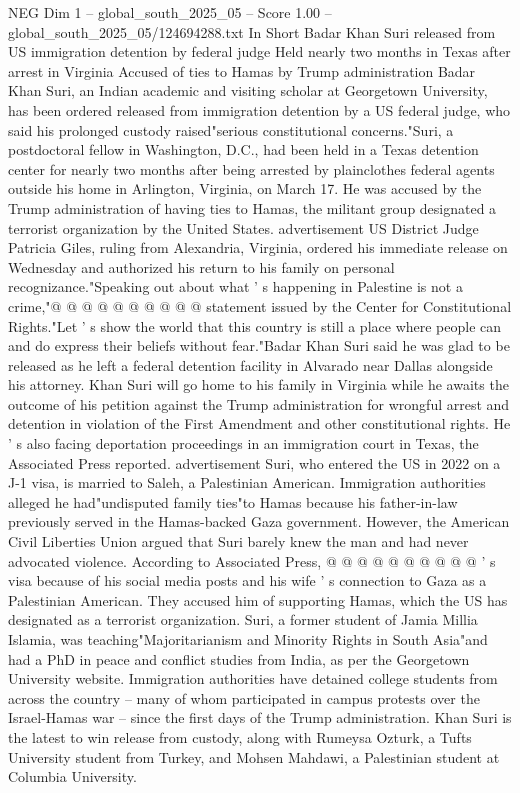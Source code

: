 \begin{textsample}{NEG Dim 1 – global\_south\_2025\_05 – Score 1.00 – global\_south\_2025\_05/124694288.txt}  \label{ex:f1_neg_385}
In Short Badar Khan Suri released from US immigration detention by federal judge Held nearly two months in Texas after arrest in Virginia Accused of ties to Hamas by Trump administration Badar Khan Suri, an Indian academic and visiting scholar at Georgetown University, has been ordered released from immigration detention by a US federal judge, who said his prolonged custody raised"serious constitutional concerns."Suri, a postdoctoral fellow in Washington, D.C., had been held in a Texas detention center for nearly two months after being arrested by plainclothes federal agents outside his home in Arlington, Virginia, on March 17.
He was accused by the Trump administration of having ties to Hamas, the militant group designated a terrorist organization by the United States. advertisement US District Judge Patricia Giles, ruling from Alexandria, Virginia, ordered his immediate release on Wednesday and authorized his return to his family on personal recognizance."Speaking out about what ' s happening in Palestine is not a crime,"@ @ @ @ @ @ @ @ @ @ statement issued by the Center for Constitutional Rights."Let ' s show the world that this country is still a place where people can and do express their beliefs without fear."Badar Khan Suri said he was glad to be released as he left a federal detention facility in Alvarado near Dallas alongside his attorney.
Khan Suri will go home to his family in Virginia while he awaits the outcome of his petition against the Trump administration for wrongful arrest and detention in violation of the First Amendment and other constitutional rights.
He ' s also facing deportation proceedings in an immigration court in Texas, the Associated Press reported. advertisement Suri, who entered the US in 2022 on a J-1 visa, is married to Saleh, a Palestinian American.
Immigration authorities alleged he had"undisputed family ties"to Hamas because his father-in-law previously served in the Hamas-backed Gaza government.
However, the American Civil Liberties Union argued that Suri barely knew the man and had never advocated violence.
According to Associated Press, @ @ @ @ @ @ @ @ @ @ ' s visa because of his social media posts and his wife ' s connection to Gaza as a Palestinian American.
They accused him of supporting Hamas, which the US has designated as a terrorist organization.
Suri, a former student of Jamia Millia Islamia, was teaching"Majoritarianism and Minority Rights in South Asia"and had a PhD in peace and conflict studies from India, as per the Georgetown University website.
Immigration authorities have detained college students from across the country -- many of whom participated in campus protests over the Israel-Hamas war -- since the first days of the Trump administration.
Khan Suri is the latest to win release from custody, along with Rumeysa Ozturk, a Tufts University student from Turkey, and Mohsen Mahdawi, a Palestinian student at Columbia University.

\end{textsample}
